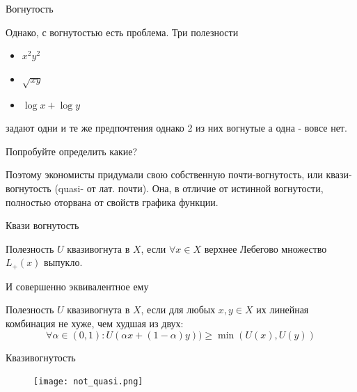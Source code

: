 \documentclass{beamer}
\begin{document}
\begin{frame}{Вогнутость}

Однако, с вогнутостью есть проблема. Три полезности

\begin{itemize}
  \item $x^2y^2$
  \item $\sqrt{xy}$
  \item $\log x + \log y$
\end{itemize}

задают одни и те же предпочтения однако 2 из них вогнутые а одна - вовсе нет.

Попробуйте определить какие?

Поэтому экономисты придумали свою собственную почти-вогнутость, или \alert{квази-вогнутость} (quasi- от лат. почти). Она, в отличие от истинной вогнутости, полностью оторвана от свойств графика функции.

\end{frame}

\begin{frame}{Квази вогнутость}

\begin{definition}
Полезность $U$ \alert{квазивогнута} в $X$, если $\forall x \in X$ верхнее Лебегово множество $L_{+}(x)$ выпукло. 
\end{definition}

И совершенно эквивалентное ему

\begin{definition}
Полезность $U$ \alert{квазивогнута} в $X$, если для любых $x, y \in X$ их линейная комбинация не хуже, чем худшая из двух:
$$ \forall \alpha \in (0,1): U(\alpha x + (1-\alpha) y)) \geqslant \min(U(x), U(y))$$

\end{definition}

\end{frame}

\begin{frame}{Квазивогнутость}

\begin{figure}[hbt]
\centering
\texttt{[image: not\_quasi.png]}
\end{figure}

\end{frame}
\end{document}

